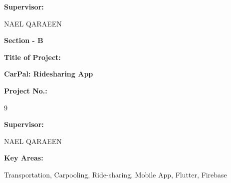 \documentclass[a4paper, 12pt]{report} %
\begin{document}
\begin{titlepage}
            \vspace{0.8cm}

            \textbf{\large{Supervisor:}}
            \vspace{0.4cm}
            
            \hspace{\parindent} NAEL QARAEEN %
            \pagebreak

            \begin{center}
                \textbf{\large{Section - B}}
                \vspace{0.8cm}
                
                \textbf{\large{Title of Project:}}
                \vspace{0.4cm}
            
                \textbf{\Large{CarPal: Ridesharing App}}
                \vspace{0.8cm}

                \textbf{\large{Project No.:}}
                \vspace{0.4cm}
                
                9
                \vspace{0.8cm}

                \textbf{\large{Supervisor:}}
                \vspace{0.4cm}
            
                NAEL QARAEEN
                \vspace{0.8cm}


                \textbf{\large{Key Areas:}}
                \vspace{0.4cm}

                Transportation, Carpooling, Ride-sharing, Mobile App, Flutter, Firebase

            \end{center}
    \end{titlepage}
\end{document}
